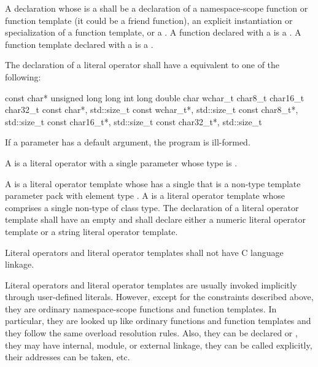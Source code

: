 \pnum
A declaration whose  is a
 shall be a declaration of a namespace-scope
function or function template (it could be a friend
function), an explicit instantiation or specialization of a
function template, or a .
A function declared with a  is a . A function template declared with a 
is a .

\pnum
The declaration of a literal operator shall have a
 equivalent to one of the following:

\begin{codeblock}
const char*
unsigned long long int
long double
char
wchar_t
char8_t
char16_t
char32_t
const char*, std::size_t
const wchar_t*, std::size_t
const char8_t*, std::size_t
const char16_t*, std::size_t
const char32_t*, std::size_t
\end{codeblock}

If a parameter has a default argument, the program is
ill-formed.

\pnum
A  is a literal operator with a single parameter
whose type is .

\pnum
A 
is a literal operator template whose 
has a single 
that is a non-type template parameter pack
with element type .
A 
is a literal operator template whose 
comprises
a single non-type  of class type.
The declaration of a literal operator template
shall have an empty 
and shall declare either a numeric literal operator template
or a string literal operator template.

\pnum
Literal operators and literal operator templates shall not have C language linkage.

\pnum
\begin{note}
Literal operators and literal operator templates are usually invoked
implicitly through user-defined literals. However, except for
the constraints described above, they are ordinary namespace-scope functions and
function templates. In particular, they are looked up like ordinary functions
and function templates and they follow the same overload resolution rules. Also,
they can be declared  or ,
they may have internal, module, or external linkage,
they can be called explicitly, their addresses can be
taken, etc.
\end{note}

